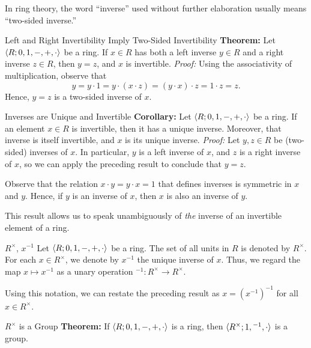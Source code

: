 \documentclass[12pt]{report}
\begin{document}
In ring theory, the word ``inverse'' used without further elaboration usually means ``two-sided inverse.''

\begin{thmbox}{Left and Right Invertibility Imply Two-Sided Invertibility}
	\textbf{Theorem:} Let ${\langle {R; 0, 1, -, +, \cdot} \rangle}$ be a ring. If $x \in R$ has both a left inverse $y \in R$ and a right inverse $z \in R$, then $y = z$, and $x$ is invertible.
\tcblower
	\textit{Proof:} Using the associativity of multiplication, observe that
	\[ y = y \cdot 1 = y \cdot (x \cdot z) = (y \cdot x) \cdot z = 1 \cdot z = z. \]
	Hence, $y = z$ is a two-sided inverse of $x$.
\end{thmbox}

\begin{thmbox}{Inverses are Unique and Invertible}
	\textbf{Corollary:} Let ${\langle {R; 0, 1, -, +, \cdot} \rangle}$ be a ring. If an element $x \in R$ is invertible, then it has a unique inverse. Moreover, that inverse is itself invertible, and $x$ is its unique inverse.
\tcblower
	\textit{Proof:} Let $y,z \in R$ be (two-sided) inverses of $x$. In particular, $y$ is a left inverse of $x$, and $z$ is a right inverse of $x$, so we can apply the preceding result to conclude that $y = z$.

	Observe that the relation $x \cdot y = y \cdot x = 1$ that defines inverses is symmetric in $x$ and $y$. Hence, if $y$ is an inverse of $x$, then $x$ is also an inverse of $y$.
\end{thmbox}

This result allows us to speak unambiguously of \textit{the} inverse of an invertible element of a ring.

\begin{dfnbox}{$R^\times$, $x^{-1}$}
	Let ${\langle {R; 0, 1, -, +, \cdot} \rangle}$ be a ring. The set of all units in $R$ is denoted by $R^\times$. For each $x \in R^\times$, we denote by $x^{-1}$ the unique inverse of $x$. Thus, we regard the map $x \mapsto x^{-1}$ as a unary operation ${}^{-1}: R^\times \to R^\times$.
\end{dfnbox}

Using this notation, we can restate the preceding result as $x = (x^{-1})^{-1}$ for all $x \in R^\times$.

\begin{thmbox}{$R^\times$ is a Group}
	\textbf{Theorem:} If ${\langle {R; 0, 1, -, +, \cdot} \rangle}$ is a ring, then ${\langle {R^\times; 1, {}^{-1}, \cdot} \rangle}$ is a group.
\end{thmbox}
\end{document}
